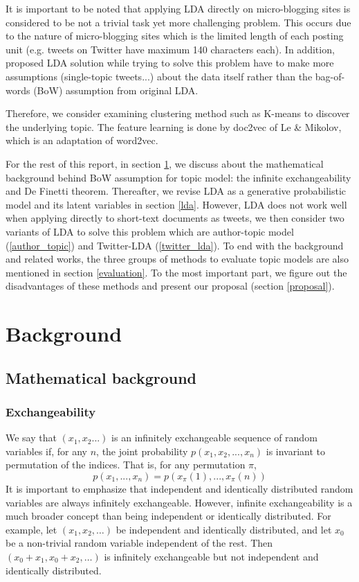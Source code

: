 \documentclass[11pt]{article}
\begin{document}
It is important to be noted that applying LDA directly on micro-blogging sites is considered to be not a trivial task yet more challenging problem. This occurs due to the nature of micro-blogging sites which is the limited length of each posting unit (e.g. tweets on Twitter have maximum 140 characters each). In addition, proposed LDA solution while trying to solve this problem have to make more assumptions (single-topic tweets...)\cite{zhao2011comparing} about the data itself rather than the bag-of-words (BoW) assumption from original LDA.

Therefore, we consider examining clustering method such as K-means to discover the underlying topic. The feature learning is done by doc2vec of Le \& Mikolov\cite{le2014distributed}, which is an adaptation of word2vec\cite{mikolov2013distributed}.

For the rest of this report, in section \ref{background}, we discuss about the mathematical background behind BoW assumption for topic model: the infinite exchangeability and De Finetti theorem. Thereafter, we revise LDA as a generative probabilistic model and its latent variables in section \ref{lda}. However, LDA does not work well when applying directly to short-text documents as tweets, we then consider two variants of LDA to solve this problem which are author-topic model (\ref{author_topic}) and Twitter-LDA (\ref{twitter_lda}). To end with the background and related works, the three groups of methods to evaluate topic models are also mentioned in section \ref{evaluation}. To the most important part, we figure out the disadvantages of these methods and present our proposal (section \ref{proposal}).


\section{Background} \label{background}


\subsection{Mathematical background} \label{math}

\subsubsection{Exchangeability}

We say that $(x_1,x_2...)$ is an infinitely exchangeable sequence of random variables if, for any $n$, the joint probability $p(x_1,x_2,...,x_n)$ is invariant to permutation of the indices. That is, for any permutation $\pi$,
\[p(x_1,...,x_n) = p(x_\pi(1),...,x_\pi(n))\]
It is important to emphasize that independent and identically distributed random variables are always infinitely exchangeable. However, infinite exchangeability is a much broader concept than being independent or identically distributed. 
For example, let $(x_1,x_2,\dots)$ be independent and identically distributed, and let $x_0$ be a non-trivial random variable independent of the rest. Then $(x_0+x_1,x_0+x_2,\dots)$ is infinitely exchangeable but not independent and identically distributed.
\end{document}
